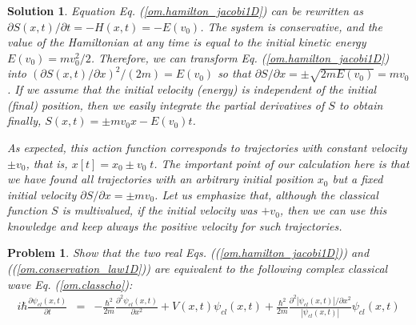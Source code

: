 \documentclass[onecolumn,nofootinbib, secnumarabic, amsmath, nobibnotes,12pt,aps,pra]{revtex4-1}
\newtheorem{problem}{Problem}
\newtheorem{solution}{Solution}
\newcommand{\pref}[1]{(\ref{#1})}
\newcommand{\eref}[1]{Eq. (\ref{#1})}
\begin{document}
\begin{solution}
Equation \eref{om.hamilton_jacobi1D} can be rewritten as ${\partial S(x,t)}/{\partial t} = -H(x,t) = -E(v_0)$. The system is conservative, and the value of the Hamiltonian at any time is equal to the initial kinetic energy $E(v_0) = m v_0^2/2$. Therefore, we can transform \eref{om.hamilton_jacobi1D} into $(\partial S(x,t)/\partial x)^2/(2 m) = E(v_0)$ so that $\partial S/\partial x = \pm \sqrt{2 m E(v_0)} = m v_0$. If we assume that the initial velocity (energy) is independent of the initial (final) position, then we easily integrate the partial derivatives of $S$ to obtain finally, $S(x,t) = \pm m v_0 x - E(v_0) t$.

As expected, this action function corresponds to trajectories with
constant velocity $\pm v_0$, that is, $x[t] = x_0 \pm v_0 \; t$. The
important point of our calculation here is that we have found all
trajectories with an arbitrary initial position $x_0$ but a fixed
initial velocity $\partial S/\partial x = \pm m v_0$. Let us
emphasize that, although the classical function $S$ is multivalued,
if the initial velocity was $ + v_0$, then we can use this knowledge  and keep always the positive velocity for such
trajectories.
\end{solution}

\begin{problem} \label{om.p3bis}
Show that the two real Eqs. (\pref{om.hamilton_jacobi1D}) and (\pref{om.conservation_law1D}) are equivalent to the following complex classical wave \eref{om.classcho}:
\begin{eqnarray}
\label{om.p.classcho}
i \hbar \frac{ \partial \psi_{cl}(x,t)} {\partial t} &=& -\frac {\hbar^2}{2m} \frac{ {\partial}^2 \psi_{cl}(x,t)} {\partial x^2} + V(x,t) \psi_{cl}(x,t)+ \frac {\hbar^{2}} {2 m} \frac { {\partial}^2 |\psi_{cl}(x,t)|/ \partial x^2}{|\psi_{cl}(x,t)|} \psi_{cl}(x,t)
\end{eqnarray}
\end{problem}
\end{document}
